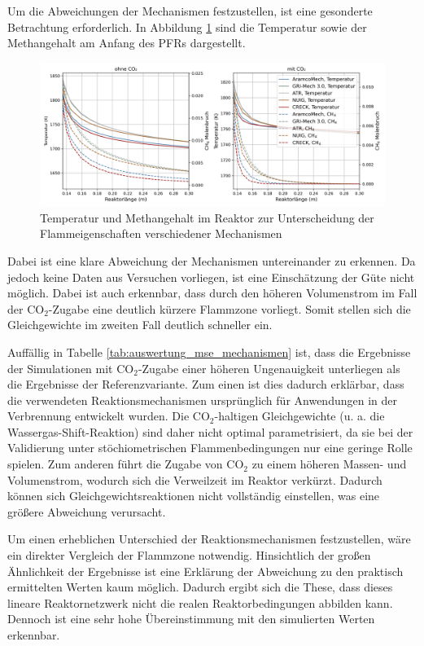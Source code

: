         Um die Abweichungen der Mechanismen festzustellen, ist eine gesonderte Betrachtung erforderlich. In Abbildung \ref{fig:temp_ch4} sind die Temperatur sowie der Methangehalt am Anfang des PFRs dargestellt. 
        \begin{figure}[H]
            \centering
            \includegraphics[width=1\linewidth]{img/Vergleich_mech/Temp_CH4.png}
            \caption{Temperatur und Methangehalt im Reaktor zur Unterscheidung der Flammeigenschaften verschiedener Mechanismen}
            \label{fig:temp_ch4}
        \end{figure}
        Dabei ist eine klare Abweichung der Mechanismen untereinander zu erkennen. Da jedoch keine Daten aus Versuchen vorliegen, ist eine Einschätzung der Güte nicht möglich. Dabei ist auch erkennbar, dass durch den höheren Volumenstrom im Fall der CO$_2$-Zugabe eine deutlich kürzere Flammzone vorliegt. Somit stellen sich die Gleichgewichte im zweiten Fall deutlich schneller ein. 

        Auffällig in Tabelle \ref{tab:auswertung_mse_mechanismen} ist, dass die Ergebnisse der Simulationen mit CO$_2$-Zugabe einer höheren Ungenauigkeit unterliegen als die Ergebnisse der Referenzvariante. Zum einen ist dies dadurch erklärbar, dass die verwendeten Reaktionsmechanismen ursprünglich für Anwendungen in der Verbrennung entwickelt wurden. Die CO$_2$-haltigen Gleichgewichte (u. a. die Wassergas-Shift-Reaktion) sind daher nicht optimal parametrisiert, da sie bei der Validierung unter stöchiometrischen Flammenbedingungen nur eine geringe Rolle spielen. Zum anderen führt die Zugabe von CO$_2$ zu einem höheren Massen- und Volumenstrom, wodurch sich die Verweilzeit im Reaktor verkürzt. Dadurch können sich Gleichgewichtsreaktionen nicht vollständig einstellen, was eine größere Abweichung verursacht.
        
        Um einen erheblichen Unterschied der Reaktionsmechanismen festzustellen, wäre ein direkter Vergleich der Flammzone notwendig. Hinsichtlich der großen Ähnlichkeit der Ergebnisse ist eine Erklärung der Abweichung zu den praktisch ermittelten Werten kaum möglich. Dadurch ergibt sich die These, dass dieses lineare Reaktornetzwerk nicht die realen Reaktorbedingungen abbilden kann. Dennoch ist eine sehr hohe Übereinstimmung mit den simulierten Werten erkennbar.

